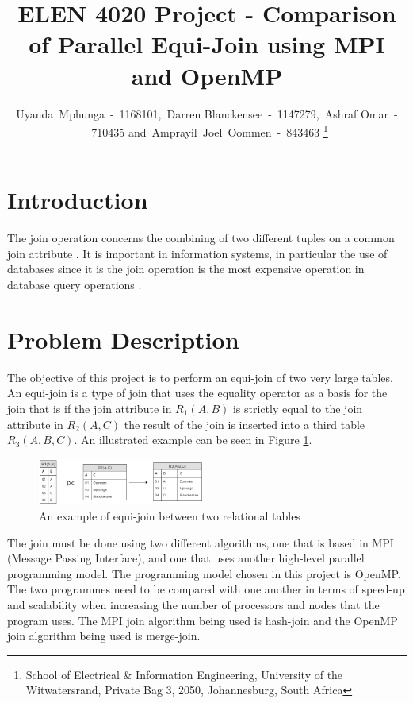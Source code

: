 \documentclass[journal,draftclsnofoot]{IEEEtran}
\begin{document}
\title{ELEN 4020 Project - Comparison of Parallel Equi-Join using MPI and OpenMP}
\author{Uyanda~Mphunga~-~1168101,~Darren Blanckensee~-~1147279,~Ashraf Omar~-~710435 and~Amprayil~Joel~Oommen~-~843463
\thanks{School of Electrical \& Information Engineering, University of the
Witwatersrand, Private Bag 3, 2050, Johannesburg, South Africa}
}
\maketitle
\pagestyle{plain}
\begin{abstract}

\end{abstract}
\section{Introduction}
The join operation concerns the combining of two different tuples on a common join attribute \cite{Yu1998}. It is important in information systems, in particular the use of databases since it is the join operation is the most expensive operation in database query operations \cite{Mishra1992}. 
\section{Problem Description}\label{prob}
The objective of this project is to perform an equi-join of two very large tables. An equi-join is a type of join that uses the equality operator as a basis for the join \cite{w3resource.com2018} that is if the join attribute in $R_{1}(A,B)$ is strictly equal to the join attribute in $R_{2}(A,C)$ the result of the join is inserted into a third table $R_{3}(A, B, C)$. An illustrated example can be seen in Figure \ref{fig:Equi-Join}.
\begin{figure}[htbp]
	\centering
		\includegraphics[width=0.4882\textwidth]{Equi-Join.png}
	\caption{An example of equi-join between two relational tables}
	\label{fig:Equi-Join}
\end{figure}
The join must be done using two different algorithms, one that is based in MPI (Message Passing Interface), and one that uses another high-level parallel programming model. The programming model chosen in this project is OpenMP. The two programmes need to be compared with one another in terms of speed-up and scalability when increasing the number of processors and nodes that the program uses. The MPI join algorithm being used is hash-join and the OpenMP join algorithm being used is merge-join.
\end{document}
